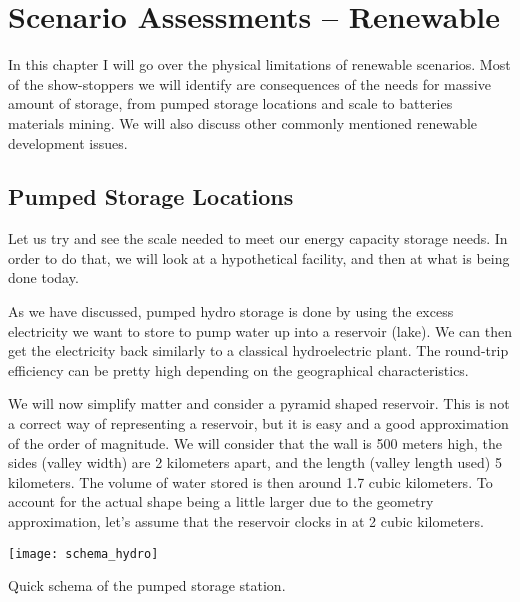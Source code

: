 \setchapterpreamble[u]{\margintoc}
\chapter{Scenario Assessments -- Renewable}

In this chapter I will go over the physical limitations of renewable scenarios. Most of the show-stoppers we will identify are consequences of the needs for massive amount of storage, from pumped storage locations and scale to batteries materials mining. We will also discuss other commonly mentioned renewable development issues.


\section{Pumped Storage Locations}

Let us try and see the scale needed to meet our energy capacity storage needs. In order to do that, we will look at a hypothetical facility, and then at what is being done today.

As we have discussed, pumped hydro storage is done by using the excess electricity we want to store to pump water up into a reservoir (lake). We can then get the electricity back similarly to a classical hydroelectric plant. The round-trip efficiency can be pretty high depending on the geographical characteristics.

We will now simplify matter and consider a pyramid shaped reservoir. This is not a correct way of representing a reservoir, but it is easy and a good approximation of the order of magnitude. We will consider that the wall is 500 meters high, the sides (valley width) are 2 kilometers apart, and the length (valley length used) 5 kilometers. The volume of water stored is then around 1.7 cubic kilometers. To account for the actual shape being a little larger due to the geometry approximation, let's assume that the reservoir clocks in at 2 cubic kilometers.

\begin{marginfigure}[-2mm]
	\texttt{[image: schema\_hydro]}
	\caption[Quick schema of the pumped storage station]{Quick schema of the pumped storage station.}
\end{marginfigure}


